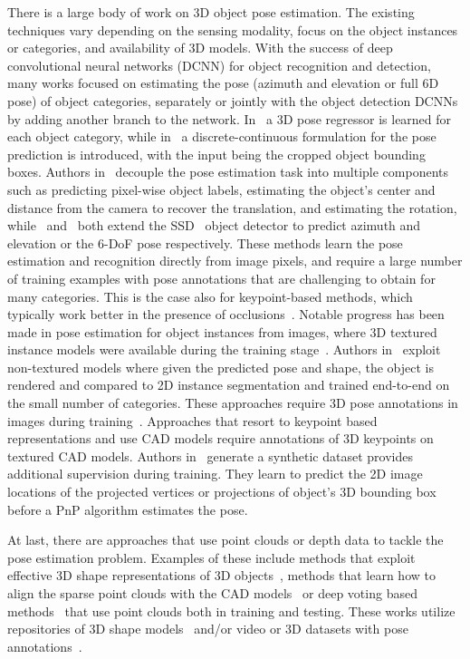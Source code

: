 \documentclass[letterpaper, 10 pt, conference]{ieeeconf}  \pdfoutput=1
\begin{document}
There is a large body of work on 3D object pose estimation. 
The existing techniques vary depending on the sensing modality, focus on the object instances or categories, and availability of 3D models. With the success of deep convolutional neural networks (DCNN) for object recognition and detection, many works focused on estimating the pose (azimuth and elevation or full 6D pose) of object categories, separately or jointly with the object detection DCNNs by adding another branch to the network.  
In~\cite{mahendran20173d} a 3D pose regressor is learned for each object category, while in~\cite{mousavian20173d} a discrete-continuous formulation for the pose prediction is introduced, with the input being the cropped object bounding boxes. Authors in~\cite{xiang2017posecnn} decouple the pose estimation task into multiple components such as predicting pixel-wise object labels, estimating the object's center and distance from the camera to recover the translation, and estimating the rotation, while~\cite{poirson2016fast} and~\cite{kehl2017ssd} both extend the SSD~\cite{liu2016ssd} object detector to predict azimuth and elevation or the 6-DoF pose respectively. These methods learn the pose estimation and recognition directly from image pixels, and require a large number of training examples with pose annotations that are challenging to obtain for many categories. This is the case also for keypoint-based methods, which typically work better in the presence of occlusions~\cite{pavlakos20176, hueting2017seethrough}. 
Notable progress has been made in pose estimation for object instances from images, where 3D textured instance models were available during the training stage~\cite{Hodan2018BOPBF}.
Authors in~\cite{kundu20183d} exploit non-textured models where given the predicted pose and shape, the object is rendered and compared to 2D instance segmentation and trained end-to-end on the small number of categories. These approaches require 3D pose annotations in images during training~\cite{xiang2014beyond, hinterstoisser2012model}. Approaches that resort to keypoint based representations and use CAD models require annotations of 3D keypoints on textured CAD models. 
Authors in~\cite{li2017deep} generate a synthetic dataset provides additional supervision during training. They learn to predict the 2D image locations of the projected vertices  or projections of object's 3D bounding box ~\cite{tekin2018real} before a PnP algorithm estimates the pose.

At last, there are approaches that use point clouds or depth data to tackle the pose estimation problem. Examples of these include methods that exploit effective 3D shape representations of 3D objects~\cite{normalized-coord-CVPR19}, methods that learn how to align the sparse point clouds with the CAD models~\cite{Scan2CAD} or deep voting based methods~\cite{DeepSlidingShapes} that use point clouds both in training and testing. These works utilize repositories of 3D shape models~\cite{xiang2016objectnet3d,chang2015shapenet} and/or video or 3D datasets with pose annotations~\cite{KITTI, SUN-RGB-D}.
\end{document}
